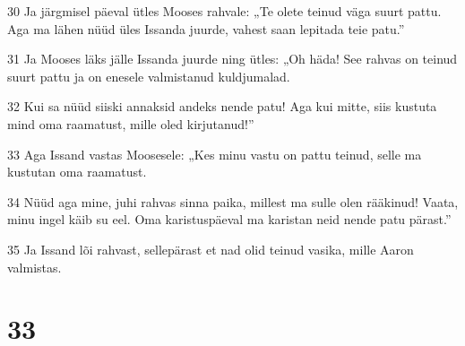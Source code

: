\par 30 Ja järgmisel päeval ütles Mooses rahvale: „Te olete teinud väga suurt pattu. Aga ma lähen nüüd üles Issanda juurde, vahest saan lepitada teie patu.”
\par 31 Ja Mooses läks jälle Issanda juurde ning ütles: „Oh häda! See rahvas on teinud suurt pattu ja on enesele valmistanud kuldjumalad.
\par 32 Kui sa nüüd siiski annaksid andeks nende patu! Aga kui mitte, siis kustuta mind oma raamatust, mille oled kirjutanud!”
\par 33 Aga Issand vastas Moosesele: „Kes minu vastu on pattu teinud, selle ma kustutan oma raamatust.
\par 34 Nüüd aga mine, juhi rahvas sinna paika, millest ma sulle olen rääkinud! Vaata, minu ingel käib su eel. Oma karistuspäeval ma karistan neid nende patu pärast.”
\par 35 Ja Issand lõi rahvast, sellepärast et nad olid teinud vasika, mille Aaron valmistas.

\chapter{33}

